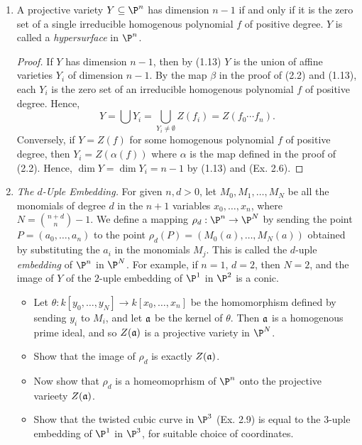 \documentclass[a4paper]{article}
\begin{document}
\begin{enumerate} [label=\textbf{\arabic*.}, leftmargin=0cm]
    \item[\textbf{8.}] A projective variety $Y \subseteq \P^n$ has dimension $n - 1$ if and only if it is the zero set of a single irreducible homogenous polynomial $f$ of positive degree. $Y$ is called a \textit{hypersurface} in $\P^n$.

          \begin{proof}
              If $Y$ has dimension $n - 1$, then by (1.13) $Y$ is the union of affine varieties $Y_i$ of dimension $n - 1$.
              By the map $\beta$ in the proof of (2.2) and (1.13), each $Y_i$ is the zero set of an irreducible homogenous polynomial $f$ of positive degree.
              Hence, $$Y = \bigcup Y_i = \bigcup_{Y_i \neq \emptyset} Z(f_i) = Z(f_0 \cdots f_n).$$
              Conversely, if $Y = Z(f)$ for some homogenous polynomial $f$ of positive degree, then $Y_i = Z(\alpha(f))$ where $\alpha$ is the map defined in the proof of (2.2).
              Hence, $\dim{Y} = \dim{Y_i} = n - 1$ by (1.13) and (Ex. 2.6).
          \end{proof}

    \item[\textbf{12.}] \textit{The $d$-Uple Embedding.}
          For given $n, d > 0$, let $M_0, M_1, \dots, M_N$ be all the monomials of degree $d$ in the $n + 1$ variables $x_0, \dots, x_n$, where $N = \binom{n + d}{n} - 1$.
          We define a mapping $\rho_d : \P^n \to \P^N$ by sending the point $P = (a_0, \dots, a_n)$ to the point $\rho_d(P) = (M_0(a), \dots, M_N(a))$ obtained by substituting the $a_i$ in the monomials $M_j$.
          This is called the $d$-uple \textit{embedding} of $\P^n$ in $\P^N$.
          For example, if $n = 1$, $d = 2$, then $N = 2$, and the image of $Y$ of the $2$-uple embedding of $\P^1$ in $\P^2$ is a conic.
          \begin{itemize}
              \item[(a)] Let $\theta : k[y_0, \dots, y_N] \to k[x_0, \dots, x_n]$ be the homomorphism defined by sending $y_i$ to $M_i$, and let $\mathfrak{a}$ be the kernel of $\theta$. Then $\mathfrak{a}$ is a homogenous prime ideal, and so $Z(\mathfrak{a})$ is a projective variety in $\P^N$.
              \item[(b)] Show that the image of $\rho_d$ is exactly $Z(\mathfrak{a})$.
              \item[(c)] Now show that $\rho_d$ is a homeomoprhism of $\P^n$ onto the projective varieety $Z(\mathfrak{a})$.
              \item[(d)] Show that the twisted cubic curve in $\P^3$ (Ex. 2.9) is equal to the $3$-uple embedding of $\P^1$ in $\P^3$, for suitable choice of coordinates.
          \end{itemize}


\end{enumerate}
\end{document}
